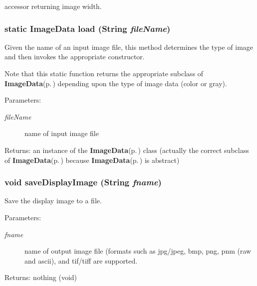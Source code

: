 accessor returning image width. 

\subsubsection{\setlength{\rightskip}{0pt plus 5cm}static {\bf Image\-Data} load (String {\em file\-Name})\hspace{0.3cm}{\tt  [static]}}\label{class_c_s_image_viewer_1_1_image_data_ead1d6066aef00aa2e8c6ee4405d5c2d}


Given the name of an input image file, this method determines the type of image and then invokes the appropriate constructor. 

Note that this static function returns the appropriate subclass of {\bf Image\-Data}{\rm (p.\,\pageref{class_c_s_image_viewer_1_1_image_data})} depending upon the type of image data (color or gray).

\begin{Desc}
\item[Parameters:]
\begin{description}
\item[{\em file\-Name}]name of input image file \end{description}
\end{Desc}
\begin{Desc}
\item[Returns:]an instance of the {\bf Image\-Data}{\rm (p.\,\pageref{class_c_s_image_viewer_1_1_image_data})} class (actually the correct subclass of {\bf Image\-Data}{\rm (p.\,\pageref{class_c_s_image_viewer_1_1_image_data})} because {\bf Image\-Data}{\rm (p.\,\pageref{class_c_s_image_viewer_1_1_image_data})} is abstract) \end{Desc}
\subsubsection{\setlength{\rightskip}{0pt plus 5cm}void save\-Display\-Image (String {\em fname})}\label{class_c_s_image_viewer_1_1_image_data_2b0a4698a0a81bc02802c6d3fc7fed04}


Save the display image to a file. 

\begin{Desc}
\item[Parameters:]
\begin{description}
\item[{\em fname}]name of output image file (formats such as jpg/jpeg, bmp, png, pnm (raw and ascii), and tif/tiff are supported. \end{description}
\end{Desc}
\begin{Desc}
\item[Returns:]nothing (void) \end{Desc}


